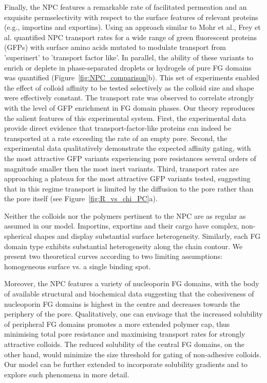\documentclass[12pt, a4paper]{article}
\begin{document}
Finally, the NPC features a remarkable rate of facilitated permeation and an exquisite permselectivity with respect to the surface features of relevant proteins (e.g., importins and exportins).
Using an approach similar to Mohr et al., Frey et al. quantified NPC transport rates for a wide range of green fluorescent proteins (GFPs) with surface amino acids mutated to modulate transport from 'superinert' to 'transport factor like'.
In parallel, the ability of these variants to enrich or deplete in phase-separated droplets or hydrogels of pure FG domains was quantified (Figure~\ref{fig:NPC_comparison}b).
This set of experiments enabled the effect of colloid affinity to be tested selectively as the colloid size and shape were effectively constant.
The transport rate was observed to correlate strongly with the level of GFP enrichment in FG domain phases.
Our theory reproduces the salient features of this experimental system.
First, the experimental data provide direct evidence that transport-factor-like proteins can indeed be transported at a rate exceeding the rate of an empty pore.
Second, the experimental data qualitatively demonstrate the expected affinity gating, with the most attractive GFP variants experiencing pore resistances several orders of magnitude smaller then the most inert variants.
Third, transport rates are approaching a plateau for the most attractive GFP variants tested, suggesting that in this regime transport is limited by the diffusion to the pore rather than the pore itself (see Figure~\ref{fig:R_vs_chi_PC}a).

Neither the colloids nor the polymers pertinent to the NPC are as regular as assumed in our model.
Importins, exportins and their cargo have complex, non-spherical shapes and display substantial surface heterogeneity.
Similarly, each FG domain type exhibits substantial heterogeneity along the chain contour.
We present two theoretical curves according to two limiting assumptions: homogeneous surface vs. a single binding spot.

Moreover, the NPC features a variety of nucleoporin FG domains, with the body of available structural and biochemical data suggesting that the cohesiveness of nucleoporin FG domains is highest in the centre and decreases towards the periphery of the pore.
Qualitatively, one can envisage that the increased solubility of peripheral FG domains promotes a more extended polymer cap, thus minimising total pore resistance and maximising transport rates for strongly attractive colloids.
The reduced solubility of the central FG domains, on the other hand, would minimize the size threshold for gating of non-adhesive colloids.
Our model can be further extended to incorporate  solubility gradients and to explore such phenomena in more detail.
\end{document}
